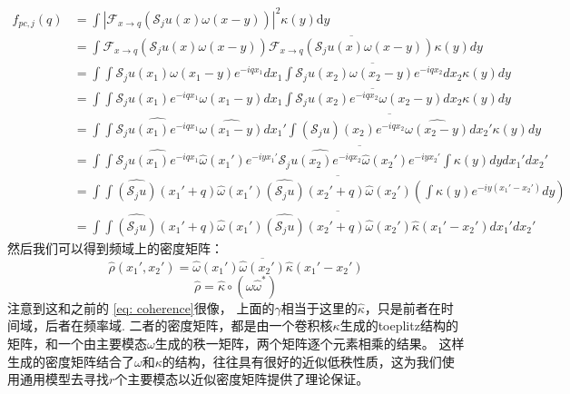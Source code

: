 \documentclass[12pt]{article}
\begin{document}
  \begin{equation}
\begin{aligned}
f_{p c, j}(q) &= \int\left|\mathcal{F}_{x \rightarrow q}\left(\mathcal{S}_{j} u(x) \omega(x-y)\right)\right|^{2} \kappa(y) \mathrm{d} y\\
&= \int \mathcal{F}_{x \rightarrow q}\left(\mathcal{S}_{j} u(x) \omega(x-y)\right) \overline{ \mathcal{F}_{x \rightarrow q}\left(\mathcal{S}_{j} u(x) \omega(x-y)\right) }  \kappa(y)     dy\\
&= \int \int \mathcal{S}_{j} u(x_1) \omega(x_1-y) e^{-iqx_1} dx_1 \overline{ \int \mathcal{S}_{j} u(x_2) \omega(x_2-y) e^{-iqx_2}dx_2 }  \kappa(y)   dy \\
&= \int \int \mathcal{S}_{j} u(x_1)e^{-iqx_1} \omega(x_1-y)  dx_1 \overline{ \int \mathcal{S}_{j} u(x_2)e^{-iqx_2} \omega(x_2-y) dx_2 }  \kappa(y)   dy\\
&= \int \int \widehat{\mathcal{S}_{j} u(x_1)e^{-iqx_1}} \widehat{\omega(x_1-y)}  dx_1' \overline{ \int \widehat{(\mathcal{S}_{j}u)(x_2) e^{-iqx_2} }  \widehat{\omega(x_2-y)} dx_2' } \kappa(y)   dy\\
& = \int\int  
\widehat{\mathcal{S}_{j} u(x_1)e^{-iqx_1}} \widehat{\omega}(x_1')e^{-iyx_1'}  \overline{ \widehat{\mathcal{S}_{j} u(x_2)e^{-iqx_2}} \widehat{\omega}(x_2')e^{-iyx_2'} }   \int   \kappa(y)   dy
dx_1' dx_2' \\
& =  \int\int  
\widehat{(\mathcal{S}_{j}u)}(x_1' + q) \widehat{\omega}(x_1')   \overline{ \widehat{(\mathcal{S}_{j}u)}(x_2' + q) \widehat{\omega}(x_2') }   (\int   \kappa(y)e^{-iy(x_1'-x_2')}  dy ) \\
& = \int\int  
\widehat{(\mathcal{S}_{j}u)}(x_1' + q) \widehat{\omega}(x_1')   \overline{ \widehat{(\mathcal{S}_{j}u)}(x_2' + q) \widehat{\omega}(x_2') }    \hat{\kappa}(x_1'-x_2')  
dx_1' dx_2'
\end{aligned}
\end{equation}
然后我们可以得到频域上的密度矩阵：
$$
\hat{\rho}(x_1',x_2') =  \hat{\omega}(x_1') \overline{\hat{\omega}(x_2')}
\hat{\kappa}(x_1'- x_2')
$$
$$
\hat{\rho}  =\hat{\kappa} \circ (\hat{\omega}\hat{\omega}^*) 
$$
注意到这和之前的 \eqref{eq: coherence}很像， 上面的$\gamma$相当于这里的$\hat{\kappa}$，只是前者在时间域，后者在频率域. 二者的密度矩阵，都是由一个卷积核$\kappa$生成的toeplitz结构的矩阵，和一个由主要模态$\omega$生成的秩一矩阵，两个矩阵逐个元素相乘的结果。 这样生成的密度矩阵结合了$\omega$和$\kappa$的结构，往往具有很好的近似低秩性质，这为我们使用通用模型去寻找$r$个主要模态以近似密度矩阵提供了理论保证。
\end{document}
